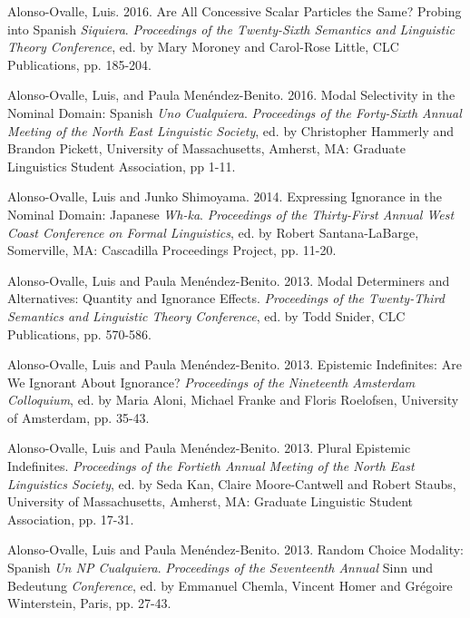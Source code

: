 \documentclass[11pt]{article}
\begin{document}
Alonso-Ovalle, Luis. 2016. Are All Concessive Scalar Particles the Same? Probing into Spanish \textit{Siquiera}.  \textit{Proceedings of the Twenty-Sixth
  Semantics and Linguistic Theory Conference}, ed. by Mary Moroney and
Carol-Rose Little, CLC Publications, pp. 185-204. %

Alonso-Ovalle, Luis, and Paula Men\'endez-Benito. 2016. Modal Selectivity
in the Nominal Domain: Spanish \textit{Uno Cualquiera}. \textit{Proceedings
of the Forty-Sixth Annual Meeting of the North East Linguistic Society},
ed. by Christopher Hammerly and Brandon Pickett, University of Massachusetts, Amherst, MA: Graduate Linguistics Student Association, pp 1-11.

Alonso-Ovalle, Luis and Junko Shimoyama. 2014. Expressing Ignorance
in the Nominal Domain: Japanese \textit{Wh-ka}. \textit{Proceedings of
  the Thirty-First Annual West Coast Conference on Formal Linguistics}, ed. by Robert
Santana-LaBarge, Somerville, MA: Cascadilla Proceedings Project, pp. 11-20.

Alonso-Ovalle, Luis and Paula
Men\'endez-Benito. 2013. Modal Determiners and Alternatives:
Quantity and Ignorance Effects.  \textit{Proceedings of the Twenty-Third
  Semantics and Linguistic Theory Conference}, ed. by Todd Snider, CLC
Publications, pp. 570-586. %

Alonso-Ovalle, Luis and Paula
Men\'endez-Benito. 2013. Epistemic Indefinites: Are We Ignorant About
Ignorance? \textit{Proceedings of the Nineteenth Amsterdam Colloquium},
ed. by Maria Aloni, Michael Franke and Floris Roelofsen, University of
Amsterdam, pp. 35-43.

Alonso-Ovalle, Luis and Paula
Men\'endez-Benito. 2013. Plural Epistemic
  Indefinites.  \textit{Proceedings of the Fortieth Annual Meeting of the North East Linguistics
    Society}, ed. by Seda Kan, Claire Moore-Cantwell and Robert
  Staubs, University of Massachusetts, Amherst, MA: Graduate Linguistic Student Association, pp. 17-31.

Alonso-Ovalle, Luis and Paula Men\'endez-Benito. 2013. Random
Choice Modality: Spanish \textit{Un {\em NP}
  Cualquiera}. \textit{Proceedings of the Seventeenth Annual} Sinn und Bedeutung \textit{Conference}, ed. by
Emmanuel Chemla, Vincent Homer and Gr\'egoire Winterstein, Paris, pp. 27-43.
\end{document}
